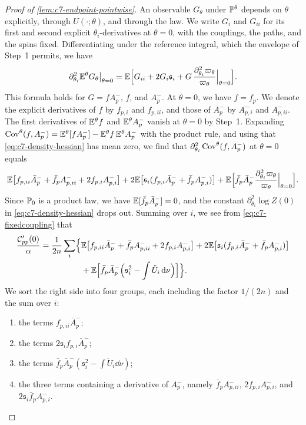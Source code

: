 \begin{proof}[Proof of \cref{lem:c7-endpoint-pointwise}]
An observable $G_\theta$ under $\mathbb P^\theta$ depends on $\theta$
explicitly, through $U(\cdot;\theta)$, and through the law. We write
$G_i$ and $G_{ii}$ for its first and second explicit
$\theta_i$-derivatives at $\theta=0$, with the couplings, the paths, and
the spins fixed. Differentiating under the reference integral, which
the envelope of Step~1 permits, we have
\[
 \partial_{\theta_i}^2\mathbb E^\theta G_\theta\big|_{\theta=0}
 =\mathbb E\Bigl[G_{ii}+2G_i\mathfrak s_i
 +G\,\frac{\partial_{\theta_i}^2\varpi_\theta}{\varpi_\theta}
 \Big|_{\theta=0}\Bigr].
\]
This formula holds for $G=fA_p^-$, $f$, and $A_p^-$. At $\theta=0$, we
have $f=f_p$. We denote the explicit derivatives of $f$ by $f_{p,i}$ and
$f_{p,ii}$, and those of $A_p^-$ by $A_{p,i}^-$ and $A_{p,ii}^-$.
The first derivatives of $\mathbb E^\theta f$ and $\mathbb E^\theta A_p^-$ vanish at
$\theta=0$ by Step~1. Expanding
$\operatorname{Cov}^\theta(f,A_p^-)=\mathbb E^\theta[fA_p^-]-\mathbb E^\theta f\,\mathbb E^\theta A_p^-$
with the product rule, and using that \eqref{eq:c7-density-hessian}
has mean zero, we find that $\partial_{\theta_i}^2\operatorname{Cov}^\theta(f,A_p^-)$
at $\theta=0$ equals
\[
 \mathbb E\bigl[f_{p,ii}\bar A_p^-+\bar f_pA_{p,ii}^-+2f_{p,i}A_{p,i}^-\bigr]
 +2\mathbb E\bigl[\mathfrak s_i(f_{p,i}\bar A_p^-+\bar f_pA_{p,i}^-)\bigr]
 +\mathbb E\Bigl[\bar f_p\bar A_p^-\frac{\partial_{\theta_i}^2\varpi_\theta}
 {\varpi_\theta}\Big|_{\theta=0}\Bigr].
\]
Since $\mathbb P_0$ is a product law, we have $\mathbb E[\bar f_p\bar A_p^-]=0$,
and the constant $\partial_{\theta_i}^2\log Z(0)$ in
\eqref{eq:c7-density-hessian} drops out. Summing over $i$, we see from
\eqref{eq:c7-fixedcoupling} that
\begin{align}
 \frac{\mathcal C_{pp}'(0)}\alpha=\frac1{2n}\sum_i\Bigl\{&
 \mathbb E\bigl[f_{p,ii}\bar A_p^-+\bar f_pA_{p,ii}^-+2f_{p,i}A_{p,i}^-\bigr]
 +2\mathbb E\bigl[\mathfrak s_i(f_{p,i}\bar A_p^-+\bar f_pA_{p,i}^-)\bigr]
 \nonumber\\
 &+\mathbb E\Bigl[\bar f_p\bar A_p^-
       \Bigl(\mathfrak s_i^2-\int\ddot U_i\,\mathrm d\nu\Bigr)\Bigr]\Bigr\}.
 \label{eq:productcovderivative}
\end{align}
We sort the right side into four groups, each including the factor
$1/(2n)$ and the sum over $i$:
\begin{enumerate}[label=(\alph*)]
\item the terms $f_{p,ii}\bar A_p^-$;
\item the terms $2\mathfrak s_if_{p,i}\bar A_p^-$;
\item the terms $\bar f_p\bar A_p^-(\mathfrak s_i^2-\int\ddot U_i\dd\nu)$;
\item the three terms containing a derivative of $A_p^-$, namely
$\bar f_pA_{p,ii}^-$, $2f_{p,i}A_{p,i}^-$, and
$2\mathfrak s_i\bar f_pA_{p,i}^-$.
\end{enumerate}


\end{proof}

